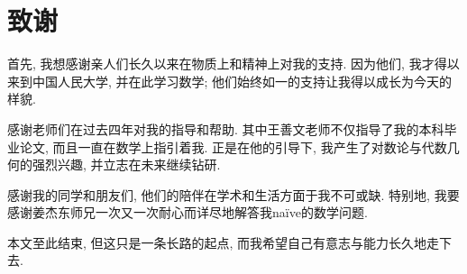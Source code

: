 \documentclass[12pt,UTF8]{ctexart}
\theoremstyle{definition}
\theoremstyle{remark}
\begin{document}
\newpage
{}
\section*{致谢}

首先, 我想感谢亲人们长久以来在物质上和精神上对我的支持. 因为他们, 我才得以来到中国人民大学, 并在此学习数学; 他们始终如一的支持让我得以成长为今天的样貌.

感谢老师们在过去四年对我的指导和帮助. 其中王善文老师不仅指导了我的本科毕业论文, 而且一直在数学上指引着我. 正是在他的引导下, 我产生了对数论与代数几何的强烈兴趣, 并立志在未来继续钻研.  

感谢我的同学和朋友们, 他们的陪伴在学术和生活方面于我不可或缺.
特别地, 我要感谢姜杰东师兄一次又一次耐心而详尽地解答我na\"ive的数学问题.

本文至此结束, 但这只是一条长路的起点, 而我希望自己有意志与能力长久地走下去.
\end{document}
